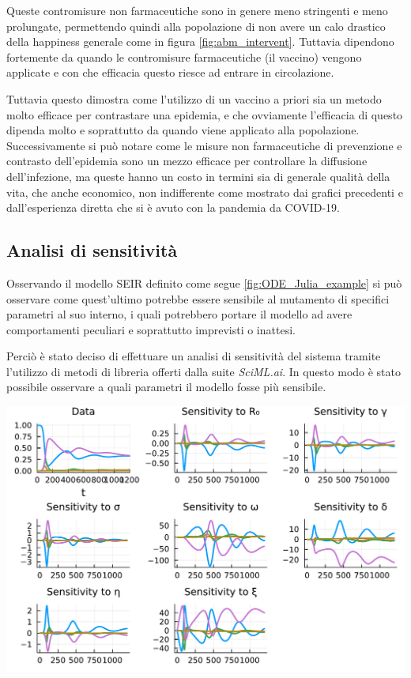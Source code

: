 Queste contromisure non farmaceutiche sono in genere meno stringenti e meno prolungate, permettendo quindi
alla popolazione di non avere un calo drastico della happiness generale come in figura \ref{fig:abm_intervent}.
Tuttavia dipendono fortemente da quando le contromisure farmaceutiche (il vaccino) vengono applicate
e con che efficacia questo riesce ad entrare in circolazione. 

Tuttavia questo dimostra come l'utilizzo di un vaccino a priori sia un metodo molto efficace per contrastare
una epidemia, e che ovviamente l'efficacia di questo dipenda molto e soprattutto da quando viene applicato 
alla popolazione. Successivamente si può notare come le misure non farmaceutiche di prevenzione e contrasto
dell'epidemia sono un mezzo efficace per controllare la diffusione dell'infezione, ma queste hanno un costo 
in termini sia di generale qualità della vita, che anche economico, non indifferente come mostrato dai grafici 
precedenti e dall'esperienza diretta che si è avuto con la pandemia da COVID-19. 

\subsection{Analisi di sensitività}
Osservando il modello SEIR definito come segue \ref{fig:ODE_Julia_example} 
si può osservare come quest'ultimo potrebbe essere sensibile al mutamento di specifici 
parametri al suo interno, i quali potrebbero portare il modello ad avere comportamenti 
peculiari e soprattutto imprevisti o inattesi.

Perciò è stato deciso di effettuare un analisi di sensitività del sistema tramite l'utilizzo 
di metodi di libreria offerti dalla suite \emph{SciML.ai}. In questo modo è stato possibile 
osservare a quali parametri il modello fosse più sensibile.

\begin{minipage}{\linewidth}
	\centering
	\includegraphics[width=\textwidth]{img/sa.pdf}
	\label{fig:sens_anal}
\end{minipage}

